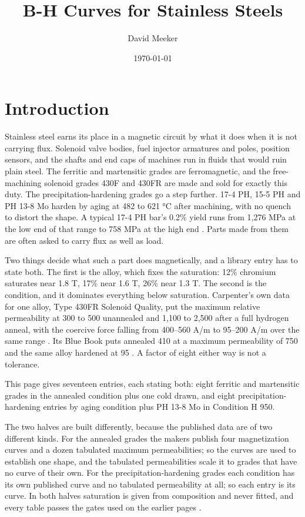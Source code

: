 \documentclass[
  11pt,
]{article}
\title{B-H Curves for Stainless Steels}
\author{David Meeker}
\date{\today}
\begin{document}
\maketitle

\section{Introduction}\label{introduction}

Stainless steel earns its place in a magnetic circuit by what it does when it is not carrying flux. Solenoid valve bodies, fuel injector armatures and poles, position sensors, and the shafts and end caps of machines run in fluids that would ruin plain steel. The ferritic and martensitic grades are ferromagnetic, and the free-machining solenoid grades 430F and 430FR are made and sold for exactly this duty. The precipitation-hardening grades go a step further. 17-4 PH, 15-5 PH and PH 13-8 Mo harden by aging at 482 to 621 °C after machining, with no quench to distort the shape. A typical 17-4 PH bar's 0.2\% yield runs from 1,276 MPa at the low end of that range to 758 MPa at the high end \cite{clf-174}. Parts made from them are often asked to carry flux as well as load.

Two things decide what such a part does magnetically, and a library entry has to state both. The first is the alloy, which fixes the saturation: 12\% chromium saturates near 1.8 T, 17\% near 1.6 T, 26\% near 1.3 T. The second is the condition, and it dominates everything below saturation. Carpenter's own data for one alloy, Type 430FR Solenoid Quality, put the maximum relative permeability at 300 to 500 unannealed and 1,100 to 2,500 after a full hydrogen anneal, with the coercive force falling from 400--560 A/m to 95--200 A/m over the same range \cite{carpenter-alloydata}. Its Blue Book puts annealed 410 at a maximum permeability of 750 and the same alloy hardened at 95 \cite{bluebook}. A factor of eight either way is not a tolerance.

This page gives seventeen entries, each stating both: eight ferritic and martensitic grades in the annealed condition plus one cold drawn, and eight precipitation-hardening entries by aging condition plus PH 13-8 Mo in Condition H 950.

The two halves are built differently, because the published data are of two different kinds. For the annealed grades the makers publish four magnetization curves and a dozen tabulated maximum permeabilities; so the curves are used to establish one shape, and the tabulated permeabilities scale it to grades that have no curve of their own. For the precipitation-hardening grades each condition has its own published curve and no tabulated permeability at all; so each entry is its curve. In both halves saturation is given from composition and never fitted, and every table passes the gates used on the earlier pages \cite{meeker-lowcarbon,meeker-iron,meeker-cofe,meeker-nife}.
\end{document}
